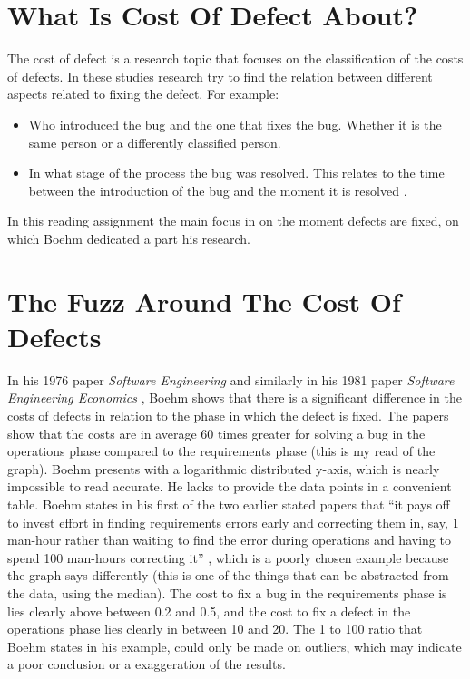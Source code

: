 \section*{What Is Cost Of Defect About?}

The cost of defect is a research topic that focuses on the classification of the costs of defects.
In these studies research try to find the relation between different aspects related to fixing the defect.
For example:
\begin{itemize}[noitemsep]
\item Who introduced the bug and the one that fixes the bug. Whether it is the same person or a differently classified person.
\item In what stage of the process the bug was resolved. This relates to the time between the introduction of the bug and the moment it is resolved \autocite{boehm1976software}.
\end{itemize}

In this reading assignment the main focus in on the moment defects are fixed, on which Boehm dedicated a part his research.


\section*{The Fuzz Around The Cost Of Defects}

In his 1976 paper \textit{Software Engineering} \autocite{boehm1976software} and similarly in his 1981 paper \textit{Software Engineering Economics} \autocite{boehm1981software},
Boehm shows that there is a significant difference in the costs of defects in relation to the phase in which the defect is fixed.
The papers show that the costs are in average 60 times greater for solving a bug in the operations phase compared to the requirements phase (this is my read of the graph).
Boehm presents with a logarithmic distributed y-axis, which is nearly impossible to read accurate. He lacks to provide the data points in a convenient table.
Boehm states in his first of the two earlier stated papers that
``it pays off to invest effort in finding requirements errors early and
correcting them in, say, 1 man-hour rather than waiting to find the error during operations
and having to spend 100 man-hours correcting it'' \autocite[4]{boehm1976software}, which is a poorly chosen example because the graph says differently (this is one of the things that can be abstracted from the data, using the median).
The cost to fix a bug in the requirements phase is lies clearly above between 0.2 and 0.5, and the cost to fix a defect in the operations phase lies clearly in between 10 and 20.
The 1 to 100 ratio that Boehm states in his example, could only be made on outliers, which may indicate a poor conclusion or a exaggeration of the results.

